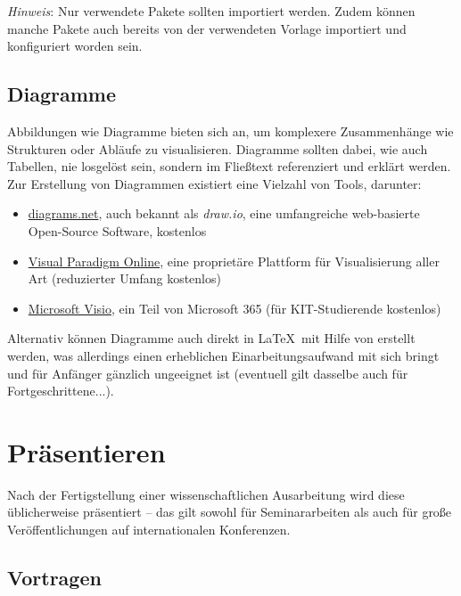 \noindent
\emph{Hinweis}: Nur verwendete Pakete sollten importiert werden.
Zudem können manche Pakete auch bereits von der verwendeten Vorlage importiert und konfiguriert worden sein.

\subsection{Diagramme}%
\label{sec:Schreiben:Diagramme}

Abbildungen wie Diagramme bieten sich an, um komplexere Zusammenhänge wie Strukturen oder Abläufe zu visualisieren. 
Diagramme sollten dabei, wie auch Tabellen, nie losgelöst sein, sondern im Fließtext referenziert und erklärt werden. 
Zur Erstellung von Diagrammen existiert eine Vielzahl von Tools, darunter:

\smallskip
\begin{itemize}[label={\symbolTool}]
    \item \href{https://www.diagrams.net//}{diagrams.net}, auch bekannt als \emph{draw.io}, eine umfangreiche web-basierte Open-Source Software, kostenlos
    \item \href{https://online.visual-paradigm.com/}{Visual Paradigm Online}, eine proprietäre Plattform für Visualisierung aller Art (reduzierter Umfang kostenlos)
    \item \href{https://www.microsoft.com/de-de/microsoft-365/visio}{Microsoft Visio}, ein Teil von Microsoft 365 (für KIT-Studierende kostenlos)
\end{itemize}
\smallskip

\noindent
Alternativ können Diagramme auch direkt in \LaTeX\ mit Hilfe von  erstellt werden, was allerdings einen erheblichen Einarbeitungsaufwand mit sich bringt und für Anfänger gänzlich ungeeignet ist (eventuell gilt dasselbe auch für Fortgeschrittene...).

\section{Präsentieren}%
\label{sec:Praesentieren}

Nach der Fertigstellung einer wissenschaftlichen Ausarbeitung wird diese üblicherweise präsentiert -- das gilt sowohl für Seminararbeiten als auch für große Veröffentlichungen auf internationalen Konferenzen.

\subsection{Vortragen}%
\label{sec:Praesentieren:Vortragen}


